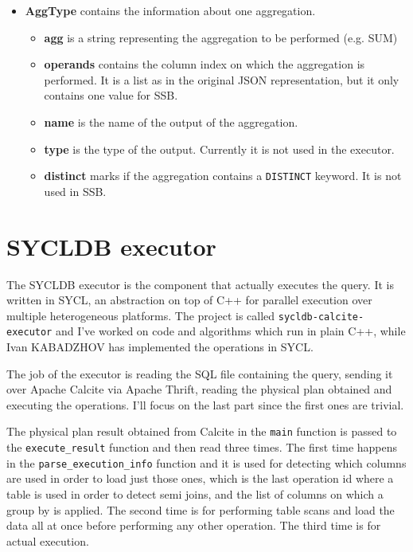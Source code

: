 \documentclass[a4paper, 10pt]{article}
\begin{document}
\begin{itemize}
\begin{itemize}
          \end{itemize}
    \item \textbf{AggType} contains the information about one aggregation.
          \begin{itemize}
              \item \textbf{agg} is a string representing the aggregation to be performed (e.g. SUM)
              \item \textbf{operands} contains the column index on which the aggregation is performed. It is a list as in the original JSON representation, but it only contains one value for SSB.
              \item \textbf{name} is the name of the output of the aggregation.
              \item \textbf{type} is the type of the output. Currently it is not used in the executor.
              \item \textbf{distinct} marks if the aggregation contains a \texttt{DISTINCT} keyword. It is not used in SSB.
          \end{itemize}
\end{itemize}

\section{SYCLDB executor}

The SYCLDB executor is the component that actually executes the query. It is written in SYCL, an abstraction on top of C++ for parallel execution over multiple heterogeneous platforms. The project is called \texttt{sycldb-calcite-executor} and I've worked on code and algorithms which run in plain C++, while Ivan KABADZHOV has implemented the operations in SYCL.

The job of the executor is reading the SQL file containing the query, sending it over Apache Calcite via Apache Thrift, reading the physical plan obtained and executing the operations. I'll focus on the last part since the first ones are trivial.

The physical plan result obtained from Calcite in the \texttt{main} function is passed to the \texttt{execute\_result} function and then read three times. The first time happens in the \texttt{parse\_execution\_info} function and it is used for detecting which columns are used in order to load just those ones, which is the last operation id where a table is used in order to detect semi joins, and the list of columns on which a group by is applied. The second time is for performing table scans and load the data all at once before performing any other operation. The third time is for actual execution.
\end{document}
